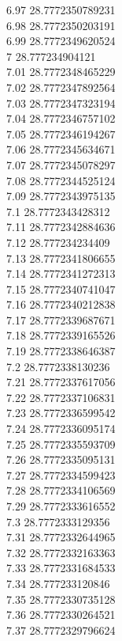 {6.97	28.7772350789231\\
6.98	28.7772350203191\\
6.99	28.7772349620524\\
7	28.777234904121\\
7.01	28.7772348465229\\
7.02	28.7772347892564\\
7.03	28.7772347323194\\
7.04	28.7772346757102\\
7.05	28.7772346194267\\
7.06	28.7772345634671\\
7.07	28.7772345078297\\
7.08	28.7772344525124\\
7.09	28.7772343975135\\
7.1	28.7772343428312\\
7.11	28.7772342884636\\
7.12	28.777234234409\\
7.13	28.7772341806655\\
7.14	28.7772341272313\\
7.15	28.7772340741047\\
7.16	28.7772340212838\\
7.17	28.7772339687671\\
7.18	28.7772339165526\\
7.19	28.7772338646387\\
7.2	28.7772338130236\\
7.21	28.7772337617056\\
7.22	28.7772337106831\\
7.23	28.7772336599542\\
7.24	28.7772336095174\\
7.25	28.7772335593709\\
7.26	28.7772335095131\\
7.27	28.7772334599423\\
7.28	28.7772334106569\\
7.29	28.7772333616552\\
7.3	28.7772333129356\\
7.31	28.7772332644965\\
7.32	28.7772332163363\\
7.33	28.7772331684533\\
7.34	28.777233120846\\
7.35	28.7772330735128\\
7.36	28.7772330264521\\
7.37	28.7772329796624\\
}
